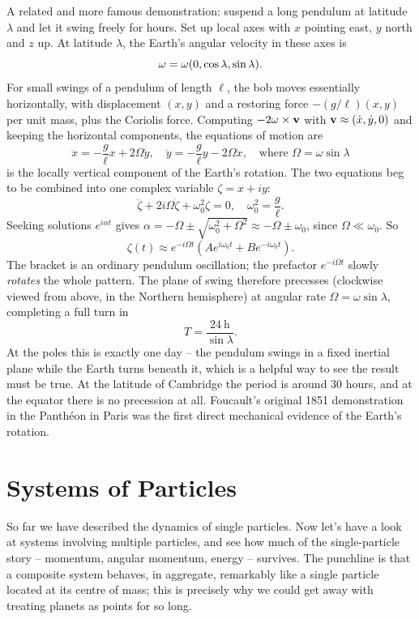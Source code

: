 \documentclass[a4paper]{scrartcl}
\begin{document}
\begin{example}
	A related and more famous demonstration: suspend a long pendulum at latitude $\lambda$ and let it swing freely for hours. Set up local axes with $x$ pointing east, $y$ north and $z$ up. At latitude $\lambda$, the Earth's angular velocity in these axes is
	$$
	\mathbf{\omega} = \omega(0, \cos\lambda, \sin \lambda).
	$$
	For small swings of a pendulum of length $\ell$, the bob moves essentially horizontally, with displacement $(x, y)$ and a restoring force $-(g/\ell)(x, y)$ per unit mass, plus the Coriolis force. Computing $-2\mathbf{\omega} \times \mathbf{v}$ with $\mathbf{v} \approx (\dot x, \dot y, 0)$ and keeping the horizontal components, the equations of motion are
	$$
	\ddot{x} = -\frac{g}{\ell}x + 2\Omega \dot{y}, \quad \ddot{y} = -\frac{g}{\ell}y - 2\Omega \dot{x}, \quad \text{where } \Omega = \omega \sin \lambda
	$$
	is the locally vertical component of the Earth's rotation. The two equations beg to be combined into one complex variable $\zeta = x + iy$:
	$$
	\ddot{\zeta} + 2i \Omega \dot{\zeta} + \omega_0^2 \zeta = 0, \quad \omega_0^2 = \frac{g}{\ell}.
	$$
	Seeking solutions $e^{i \alpha t}$ gives $\alpha = -\Omega \pm \sqrt{\omega_0^2 + \Omega^2} \approx -\Omega \pm \omega_0$, since $\Omega \ll \omega_0$. So
	$$
	\zeta(t) \approx e^{-i\Omega t}\left(A e^{i \omega_0 t} + B e^{-i\omega_0 t}\right).
	$$
	The bracket is an ordinary pendulum oscillation; the prefactor $e^{-i\Omega t}$ slowly \emph{rotates} the whole pattern. The plane of swing therefore precesses (clockwise viewed from above, in the Northern hemisphere) at angular rate $\Omega = \omega \sin\lambda$, completing a full turn in
	$$
	T = \frac{\SI{24}{\hour}}{\sin \lambda}.
	$$
	At the poles this is exactly one day -- the pendulum swings in a fixed inertial plane while the Earth turns beneath it, which is a helpful way to see the result must be true. At the latitude of Cambridge the period is around $30$ hours, and at the equator there is no precession at all. Foucault's original 1851 demonstration in the Panthéon in Paris was the first direct mechanical evidence of the Earth's rotation.
\end{example}


\section{Systems of Particles} \label{dr-sec:systems}

So far we have described the dynamics of single particles. Now let's have a look at systems involving multiple particles, and see how much of the single-particle story -- momentum, angular momentum, energy -- survives. The punchline is that a composite system behaves, in aggregate, remarkably like a single particle located at its centre of mass; this is precisely why we could get away with treating planets as points for so long.
\end{document}
